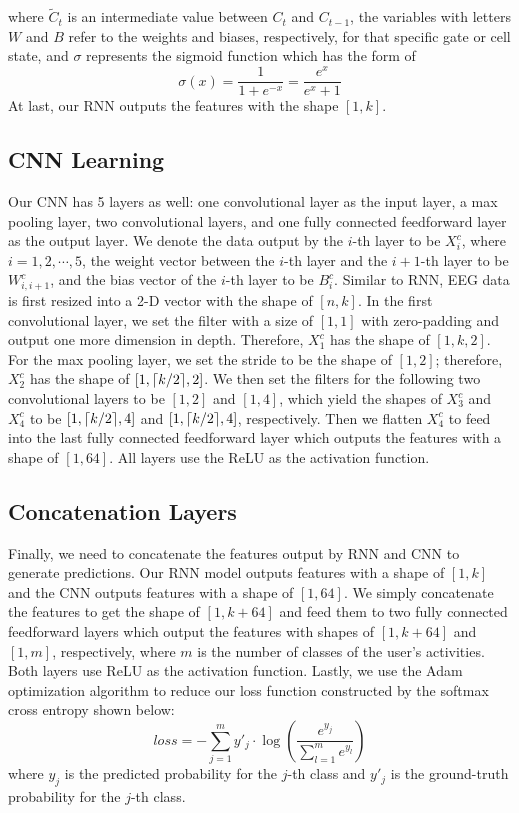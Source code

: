 where $\widetilde{C}_{t}$ is an intermediate value between $C_{t}$ and $C_{t-1}$, the variables with letters $W$ and $B$ refer to the weights and biases, respectively, for that specific gate or cell state, and $\sigma$ represents the sigmoid function which has the form of
\begin{equation}
\sigma(x) = \frac{1}{1+e^{-x}} = \frac{e^{x}}{e^{x} + 1}
\end{equation}
At last, our RNN outputs the features with the shape $[1, k]$. 

\subsection{CNN Learning}
Our CNN has 5 layers as well: one convolutional layer as the input layer, a max pooling layer, two convolutional layers, and one fully connected feedforward layer as the output layer. We denote the data output by the $i$-th layer to be $X_i^{c}$, where $i=1,2,\cdots,5$, the weight vector between the $i$-th layer and the $i+1$-th layer to be $W_{i,i+1}^{c}$, and the bias vector of the $i$-th layer to be $B_{i}^{c}$. Similar to RNN, EEG data is first resized into a 2-D vector with the shape of $[n,k]$. In the first convolutional layer, we set the filter with a size of $[1, 1]$ with zero-padding and output one more dimension in depth. Therefore, $X_1^{c}$ has the shape of $[1, k, 2]$. For the max pooling layer, we set the stride to be the shape of $[1, 2]$; therefore, $X_{2}^{c}$ has the shape of $[1, \lceil k/2\rceil, 2]$. We then set the filters for the following two convolutional layers to be $[1, 2]$ and $[1, 4]$, which yield the shapes of $X_3^{c}$ and $X_4^{c}$ to be $[1, \lceil k/2\rceil, 4]$ and $[1, \lceil k/2\rceil, 4]$, respectively. Then we flatten $X_4^{c}$ to feed into the last fully connected feedforward layer which outputs the features with a shape of $[1, 64]$. All layers use the ReLU as the activation function.

\subsection{Concatenation Layers}
Finally, we need to concatenate the features output by RNN and CNN to generate predictions. Our RNN model outputs features with a shape of $[1, k]$ and the CNN outputs features with a shape of $[1, 64]$. We simply concatenate the features to get the shape of $[1, k + 64]$ and feed them to two fully connected feedforward layers which output the features with shapes of $[1, k+64]$ and $[1, m]$, respectively, where $m$ is the number of classes of the user's activities. Both layers use ReLU as the activation function. Lastly, we use the Adam optimization algorithm \cite{kingma2014adam} to reduce our loss function constructed by the softmax cross entropy shown below:
\begin{equation}
loss = - \sum_{j=1}^{m} y'_j \cdot \log(\frac{e^{y_j}}{\sum_{l=1}^m e^{y_l}})
\end{equation}
where $y_j$ is the predicted probability for the $j$-th class and $y'_j$ is the ground-truth probability for the $j$-th class.
